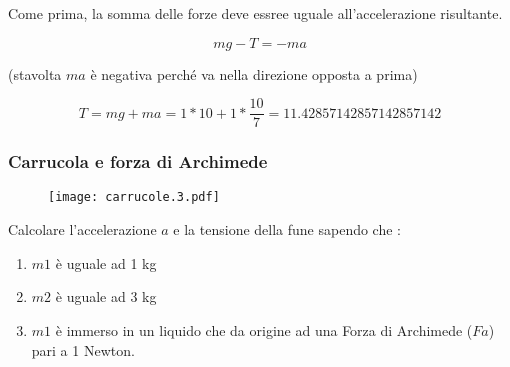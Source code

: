 \begin{enumerate}
\begin{minipage}{\textwidth}
Come prima, la somma delle forze deve essree uguale all'accelerazione risultante.

\begin{equation}
mg -T = -ma
\end{equation}

(stavolta $ma$ è negativa perché va nella direzione opposta a prima)

\begin{equation}
T=mg +ma=1*10+1*\frac{10}{7}= 11.42857142857142857142
\end{equation}

\end{minipage}
\end{enumerate}

\subsubsection{Carrucola e forza di Archimede}

\begin{figure}[h]
\centering
\texttt{[image: carrucole.3.pdf]}
\end{figure}

Calcolare l'accelerazione $a$ e la tensione della fune sapendo che :

\begin{enumerate}
\item $m1$ è uguale ad 1 kg
\item $m2$ è uguale ad 3 kg
\item $m1$ è immerso in un liquido che da origine ad una Forza di Archimede ($Fa$) pari a 1 Newton.
\end{enumerate}
